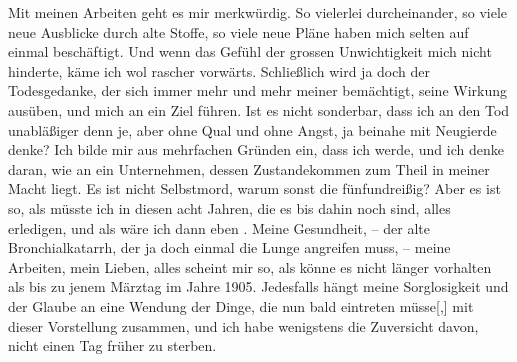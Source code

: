 \pstart
           {\pb}Mit meinen Arbeiten geht es
               mir merkwürdig. So vielerlei durcheinander, so viele neue Ausblicke durch alte
               Stoffe, so viele neue Pläne haben mich selten auf einmal beschäftigt. Und wenn das
               Gefühl der grossen Unwichtigkeit mich nicht hinderte, käme ich wol rascher vorwärts.
               Schließlich wird ja doch der Todesgedanke, der sich immer mehr und mehr meiner
               bemächtigt, seine Wirkung ausüben, und mich an ein Ziel führen. Ist es nicht
               sonderbar, dass ich an den Tod unabläßiger denn je, aber ohne Qual und ohne Angst, ja
               beinahe mit Neugierde denke? Ich bilde mir aus mehrfachen Gründen ein, dass ich
                  \label{K_L03266-4v}\label{K_L03266-4} werde, und ich denke daran, wie an
               ein Unternehmen, dessen Zustandekommen zum Theil in meiner Macht liegt. Es ist nicht
               Selbstmord, warum sonst die fünfundreißig? Aber es ist so, als müsste ich in diesen
                  {\pb}acht Jahren, die es bis
               dahin noch sind, alles erledigen, und als wäre ich dann eben \label{K_L03266-5v}\label{K_L03266-5}. Meine Gesundheit, – der alte Bronchialkatarrh, der ja doch einmal
               die Lunge angreifen muss, – meine Arbeiten, mein Lieben, alles scheint mir so, als
               könne es nicht länger vorhalten als bis zu jenem Märztag im Jahre 1905. Jedesfalls hängt meine Sorglosigkeit und der Glaube an eine Wendung
               der Dinge, die nun bald eintreten müsse{[},{]} mit dieser Vorstellung
               zusammen, und ich habe wenigstens die Zuversicht davon, nicht einen Tag früher zu
               sterben.\pend
           
